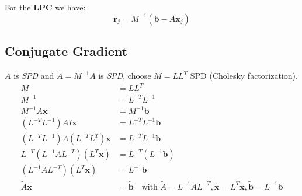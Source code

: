 For the \textbf{LPC} we have:
\[
    \mathbf{r}_j = M^{-1} (\mathbf{b} - A \mathbf{x}_j)
\]


\subsection{Conjugate Gradient}
$A$ is \emph{SPD} and $\tilde{A} = M^{-1} A$ is \emph{SPD}, choose $M = L L^T$ SPD (Cholesky factorization).
\begin{align*}
    M                                         & = L L^T                                                                                                                                          \\
    M^{-1}                                    & = L^{-T} L^{-1}                                                                                                                                  \\
    M^{-1} A \mathbf{x}                       & = M^{-1} \mathbf{b}                                                                                                                              \\
    (L^{-T} L^{-1}) A I \mathbf{x}            & = L^{-T} L^{-1} \mathbf{b}                                                                                                                       \\
    (L^{-T} L^{-1}) A (L^{-T} L^T) \mathbf{x} & = L^{-T} L^{-1} \mathbf{b}                                                                                                                       \\
    L^{-T} (L^{-1} A L^{-T}) (L^T \mathbf{x}) & = L^{-T} (L^{-1} \mathbf{b})                                                                                                                     \\
    (L^{-1} A L^{-T}) (L^T \mathbf{x})        & = L^{-1} \mathbf{b}                                                                                                                              \\
    \tilde{A} \tilde{\mathbf{x}}              & = \tilde{\mathbf{b}} \quad \text{with } \tilde{A} = L^{-1} A L^{-T}, \tilde{\mathbf{x}} = L^T \mathbf{x}, \tilde{\mathbf{b}} = L^{-1} \mathbf{b}
\end{align*}


